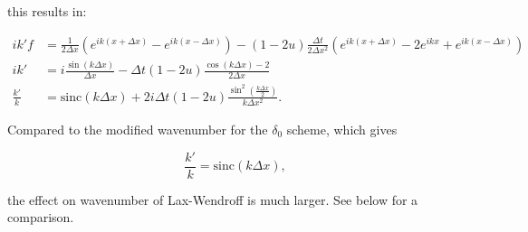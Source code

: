 \documentclass[11pt]{article}
\begin{document}
this results in:

\begin{align}
    ik'f &=  \frac{1}{2 \Delta x}\left( e^{ik(x + \Delta x)} - e^{ik(x - \Delta x)}\right) - (1-2u)\frac{\Delta t}{2 \Delta x^2}\left(e^{ik(x + \Delta x)} -2e^{ikx} + e^{ik(x - \Delta x)}\right) \\
    ik' & = i\frac{\sin(k\Delta x)}{\Delta x} - \Delta t(1-2u)\frac{\cos(k\Delta x) - 2}{2 \Delta x} \\
    \frac{k'}{k}    &= \text{sinc}(k\Delta x) + 2i\Delta t(1-2u)\frac{\sin^2\left(\frac{k\Delta x}{2}\right)}{k\Delta x^2}.
\end{align}

Compared to the modified wavenumber for the \(\delta_0\) scheme, which
gives

\begin{equation}
    \frac{k'}{k} = \text{sinc}(k\Delta x),
\end{equation}

the effect on wavenumber of Lax-Wendroff is much larger. See below for a
comparison.
\end{document}
